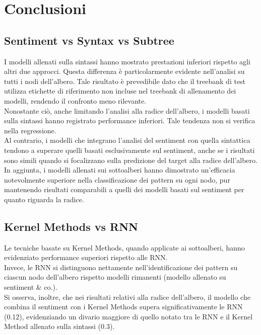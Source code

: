 \section{Conclusioni}

\subsection{Sentiment vs Syntax vs Subtree}

I modelli allenati sulla sintassi hanno mostrato prestazioni inferiori 
rispetto agli altri due approcci. Questa differenza è particolarmente evidente 
nell'analisi su tutti i nodi dell'albero. Tale risultato è prevedibile dato 
che il treebank di test utilizza etichette di riferimento non incluse
nel treebank di allenamento dei modelli, rendendo il confronto meno rilevante.\\
Nonostante ciò, anche limitando l'analisi alla radice dell'albero, i modelli 
basati sulla sintassi hanno registrato performance inferiori. Tale tendenza non 
si verifica nella regressione. \\
Al contrario, i modelli che integrano l'analisi del sentiment con quella
sintattica tendono a superare quelli basati esclusivamente sul sentiment, anche
se i risultati sono simili quando si focalizzano sulla predizione del target
alla radice dell'albero.\\
In aggiunta, i modelli allenati sui sottoalberi hanno dimostrato un'efficacia
notevolmente superiore nella classificazione dei pattern su ogni nodo, pur
mantenendo risultati comparabili a quelli dei modelli basati sul sentiment per
quanto riguarda la radice.

\subsection{Kernel Methods vs RNN}

Le tecniche basate su Kernel Methods, quando applicate ai sottoalberi, hanno
evidenziato performance superiori rispetto alle RNN. \\
Invece, le RNN si distinguono nettamente nell'identificazione dei pattern su 
ciascun nodo dell'albero rispetto modelli rimanenti (modello allenato su 
sentiment \& co.).\\
Si osserva, inoltre, che nei risultati relativi alla radice dell'albero, il
modello che combina il sentiment con i Kernel Methods supera
significativamente le RNN (0.12), evidenziando un divario maggiore di quello 
notato tra le RNN e il Kernel Method allenato sulla sintassi (0.3).

